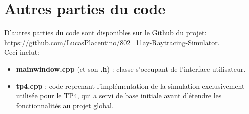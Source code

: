 %

\newpage
\section{Autres parties du code}
\label{appendix:autres-codes}
D'autres parties du code sont disponibles sur le Github du projet:\\
\underline{\url{https://github.com/LucasPlacentino/802_11ay-Raytracing-Simulator}}.\\

Ceci inclut:
\begin{itemize}
    \item \textbf{mainwindow.cpp} (et son \textbf{.h}) : classe s'occupant de l'interface utilisateur.
    \item \textbf{tp4.cpp} : code reprenant l'implémentation de la simulation exclusivement utilisée pour le TP4, qui a servi de base initiale avant d'étendre les fonctionnalités au projet global.
\end{itemize}
